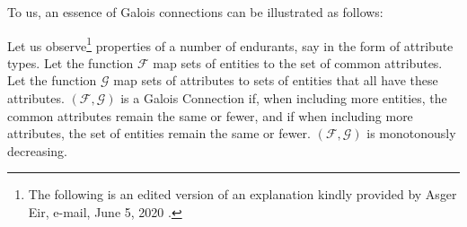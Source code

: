 \begynd
\pind To us, an essence of Galois connections can be illustrated as
follows:\begyndbegin

\begynd 
\pind Let us observe\footnote{\LLLL The following is an edited version
  of an explanation kindly provided
  by \nyl Asger Eir, e-mail, June 5, 2020
  \cite{AsgerEir2004,AsgerEir07,dines:wpderoever:2008}.} properties of
a number of endurants, \nyl say in the form of attribute types.
\pind Let the function $\mathcal{F}$ map sets of entities to the set
of common attributes.
\pind Let the function $\mathcal{G}$ map sets of attributes  \nyl to sets of entities that
all have these attributes.
\pind $(\mathcal{F},\mathcal{G})$ is a Galois Connection\ysf{:}
\begynd
\pind if, when including more entities, \nyl the common attributes remain
the same or fewer, and
\pind if when including more attributes, \nyl the set of entities remain
the same or fewer.
\pind  $(\mathcal{F},\mathcal{G})$ is monotonously decreasing. 
\afslut
\afslut\beginbegynd
\afslut

